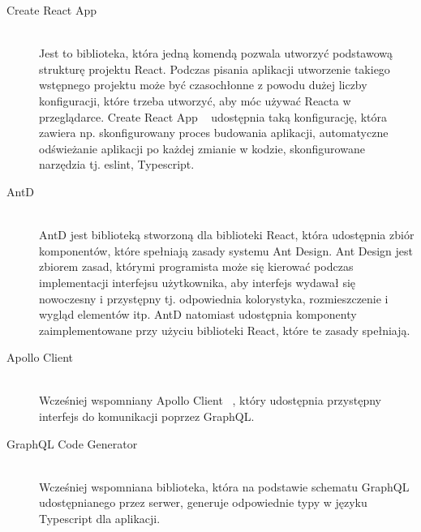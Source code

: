 \begin{description}
  \item[Create React App] \hfill \\ Jest to biblioteka, która jedną komendą pozwala utworzyć podstawową strukturę projektu React. Podczas pisania aplikacji utworzenie takiego wstępnego projektu może być czasochłonne z powodu dużej liczby konfiguracji, które trzeba utworzyć, aby móc używać Reacta w przeglądarce. Create React App ~\cite{ref_cra_doc} udostępnia taką konfigurację, która zawiera np. skonfigurowany proces budowania aplikacji, automatyczne odświeżanie aplikacji po każdej zmianie w kodzie, skonfigurowane narzędzia tj. eslint, Typescript.

  \vspace{0.4cm}

  \item[AntD] \hfill \\ AntD jest biblioteką stworzoną dla biblioteki React, która udostępnia zbiór komponentów, które spełniają zasady systemu Ant Design. Ant Design jest zbiorem zasad, którymi programista może się kierować podczas implementacji interfejsu użytkownika, aby interfejs wydawał się nowoczesny i przystępny tj. odpowiednia kolorystyka, rozmieszczenie i wygląd elementów itp. AntD natomiast udostępnia komponenty zaimplementowane przy użyciu biblioteki React, które te zasady spełniają.

  \vspace{0.4cm}

  \item[Apollo Client] \hfill \\ Wcześniej wspomniany Apollo Client ~\cite{ref_apollo_doc}, który udostępnia przystępny interfejs do komunikacji poprzez GraphQL.

  \vspace{0.4cm}

  \item[GraphQL Code Generator] \hfill \\ Wcześniej wspomniana biblioteka, która na podstawie schematu GraphQL udostępnianego przez serwer, generuje odpowiednie typy w języku Typescript dla aplikacji.

\end{description}

